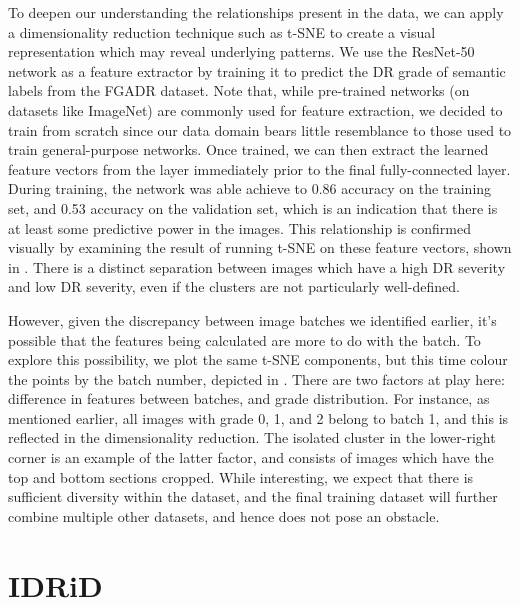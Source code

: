 To deepen our understanding the relationships present in the data, we can apply a dimensionality reduction technique such as t-SNE to create a visual representation which may reveal underlying patterns.
We use the ResNet-50 network as a feature extractor by training it to predict the DR grade of semantic labels from the FGADR dataset.
Note that, while pre-trained networks (on datasets like ImageNet) are commonly used for feature extraction, we decided to train from scratch since our data domain bears little resemblance to those used to train general-purpose networks.
Once trained, we can then extract the learned feature vectors from the layer immediately prior to the final fully-connected layer.
During training, the network was able achieve to 0.86 accuracy on the training set, and 0.53 accuracy on the validation set, which is an indication that there is at least some predictive power in the images.
This relationship is confirmed visually by examining the result of running t-SNE on these feature vectors, shown in .
There is a distinct separation between images which have a high DR severity and low DR severity, even if the clusters are not particularly well-defined.

However, given the discrepancy between image batches we identified earlier, it's possible that the features being calculated are more to do with the batch.
To explore this possibility, we plot the same t-SNE components, but this time colour the points by the batch number, depicted in .
There are two factors at play here: difference in features between batches, and grade distribution.
For instance, as mentioned earlier, all images with grade 0, 1, and 2 belong to batch 1, and this is reflected in the dimensionality reduction.
The isolated cluster in the lower-right corner is an example of the latter factor, and consists of images which have the top and bottom sections cropped.
While interesting, we expect that there is sufficient diversity within the dataset, and the final training dataset will further combine multiple other datasets, and hence does not pose an obstacle.

\section{IDRiD}

